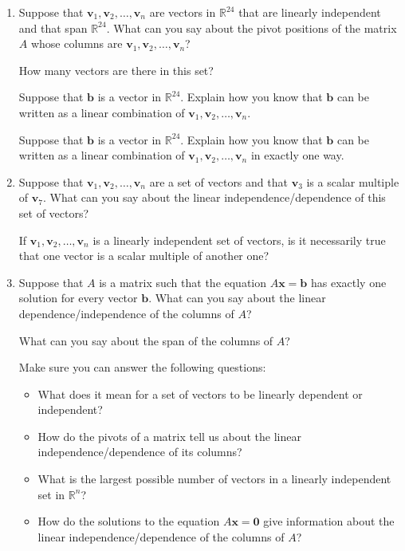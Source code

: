 \documentclass[12pt]{article}
\newcommand{\vs}[1]{\vspace{#1in}}
\newcommand{\bvec}{{\mathbf b}}
\newcommand{\vvec}{{\mathbf v}}
\newcommand{\xvec}{{\mathbf x}}
\newcommand{\zerovec}{{\mathbf 0}}
\newcommand{\real}{{\mathbb R}}
\begin{document}
\begin{enumerate}
  \vs{1}

\item Suppose that $\vvec_1, \vvec_2, \ldots, \vvec_n$ are vectors in
  $\real^{24}$ that are linearly independent and that span $\real^{24}$.
  What can you say about the pivot positions of the matrix $A$ whose
  columns are $\vvec_1, \vvec_2, \ldots, \vvec_n$?

  \vs{1}
  How many vectors are there in this set?

  \vs{1}
  Suppose that $\bvec$ is a vector in $\real^{24}$.  Explain how you
  know that $\bvec$ can be written as a linear combination of
  $\vvec_1,\vvec_2, \ldots,\vvec_n$.

  \vs{1}
  Suppose that $\bvec$ is a vector in $\real^{24}$.  Explain how you
  know that $\bvec$ can be written as a linear combination of
  $\vvec_1,\vvec_2, \ldots,\vvec_n$ in exactly one way.

  \vs{1}
%  
\item Suppose that $\vvec_1,\vvec_2,\ldots,\vvec_n$ are a set of
  vectors and that $\vvec_3$ is a scalar multiple of $\vvec_7$.  What
  can you say about the linear independence/dependence of this set of
  vectors?

  \vs{1}
  If $\vvec_1,\vvec_2,\ldots,\vvec_n$ is a linearly independent set of
  vectors, is it necessarily true that one vector is a scalar multiple
  of another one?

  \vs{1}
\item Suppose that $A$ is a matrix such that the equation
  $A\xvec=\bvec$ has exactly one solution for every vector $\bvec$.
  What can you say about the linear dependence/independence of the
  columns of $A$?

  \vs{1}
  What can you say about the span of the columns of $A$?

  \vs{1}
  \begin{tcolorbox}
    Make sure you can answer the following questions:
    \begin{itemize}
    \item What does it mean for a set of vectors to be linearly
      dependent or independent?
    \item How do the pivots of a matrix tell us about the linear
      independence/dependence of its columns?
    \item What is the largest possible number of vectors in a linearly
      independent set in $\real^n$?
    \item How do the solutions to the equation $A\xvec=\zerovec$ give
      information about the linear independence/dependence of the
      columns of $A$?
    \end{itemize}
  \end{tcolorbox}
  
  

\end{enumerate}
\end{document}
